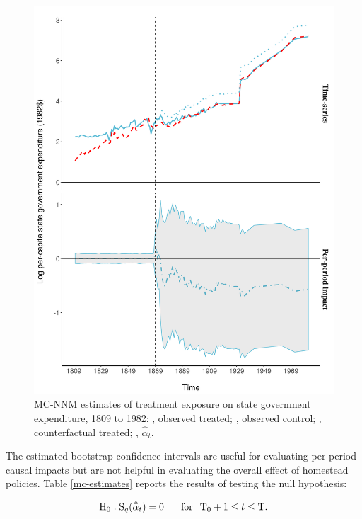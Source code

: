 \documentclass[hidelinks,12pt]{article}
\DeclareRobustCommand\sampleline[1]{%
	\tikz\draw[#1] (0,0) (0,\the\dimexpr\fontdimen22\textfont2\relax)
	-- (2em,\the\dimexpr\fontdimen22\textfont2\relax);%
}
\begin{document}
\begin{figure}[htbp]
	\centering
	\includegraphics[width=\textwidth]{plots/mc-exp-pc.png}
	\caption{MC-NNM estimates of treatment exposure on state government expenditure, 1809 to 1982:
		{\color{Darjeeling15}{\sampleline{}}}, observed treated;
		{\color{Darjeeling11}{\sampleline{dashed}}}, observed control;
		{\color{Darjeeling15}{\sampleline{dotted}}}, counterfactual treated;
		{\color{Darjeeling15}{\sampleline{dash pattern=on .7em off .2em on .05em off .2em}}}, $\hat{\bar{\alpha}}_{t}$.\label{mc-estimates-exp-pc}} 
\end{figure}

The estimated bootstrap confidence intervals are useful for evaluating per-period causal impacts but are not helpful in evaluating the overall effect of homestead policies. Table \ref{mc-estimates} reports the results of testing the null hypothesis:

\begin{equation} \label{h0}
\text{H}_0: \text{S}_q (\hat{\bar{\alpha}}_{t}) = 0  \, \hspace{5mm} \,  \text{for} \, \hspace{2mm}  \text{T}_0 + 1 \leq t \leq \text{T}.
\end{equation}
\noindent
\end{document}
